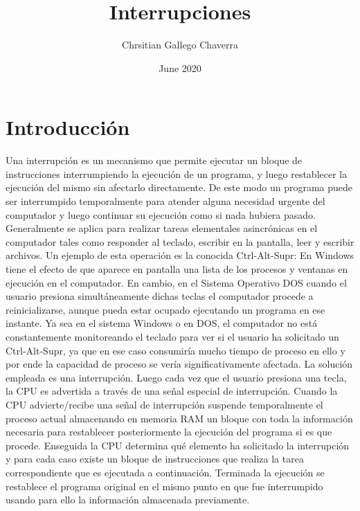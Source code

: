 \documentclass{article}
\title{Interrupciones}
\author{Chrsitian Gallego Chaverra}
\date{June 2020}
\begin{document}
\maketitle

\section{Introducción}
Una interrupción es un mecanismo que permite ejecutar un bloque de instrucciones interrumpiendo la ejecución de un programa, y luego restablecer la ejecución del mismo sin afectarlo directamente. De este modo un programa puede ser interrumpido temporalmente para atender alguna necesidad urgente del computador y luego continuar su ejecución como si nada hubiera pasado.
Generalmente se aplica para realizar tareas elementales asincrónicas en el computador tales como responder al teclado, escribir en la pantalla, leer y escribir archivos. Un ejemplo de esta operación es la conocida Ctrl-Alt-Supr: En Windows tiene el efecto de que aparece en pantalla una lista de los procesos y ventanas en ejecución en el computador. En cambio, en el Sistema Operativo DOS cuando el usuario presiona simultáneamente dichas teclas el computador procede a reinicializarse, aunque pueda estar ocupado ejecutando un programa en ese instante. Ya sea en el sistema Windows o en DOS, el computador no está constantemente monitoreando el teclado para ver si el usuario ha solicitado un Ctrl-Alt-Supr, ya que en ese caso consumiría mucho tiempo de proceso en ello y por ende la capacidad de proceso se vería significativamente afectada. La solución empleada es una interrupción.
Luego cada vez que el usuario presiona una tecla, la CPU es advertida a través de una señal especial de interrupción. Cuando la CPU advierte/recibe una señal de interrupción suspende temporalmente el proceso actual almacenando en memoria RAM un bloque con toda la información necesaria para restablecer posteriormente la ejecución del programa si es que procede. Enseguida la CPU determina qué elemento ha solicitado la interrupción y para cada caso existe un bloque de instrucciones que realiza la tarea correspondiente que es ejecutada a continuación. Terminada la ejecución se restablece el programa original en el mismo punto en que fue interrumpido usando para ello la información almacenada previamente.
\end{document}
